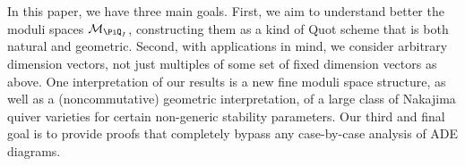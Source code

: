 In this paper, we have three main goals.
First, we aim to
understand better the moduli spaces $\mathcal{M}_{\PiQ_I}$,
constructing them as a kind of Quot scheme
that is both natural and geometric.
Second, with applications in mind, we consider arbitrary dimension vectors, not just multiples of some set of fixed dimension vectors as above. One interpretation of our results is a new fine moduli space structure, as well as a (noncommutative)
geometric interpretation, of a large class of
Nakajima quiver varieties for certain non-generic stability parameters.
Our third and final goal is to provide proofs that completely bypass any case-by-case analysis of ADE diagrams.
